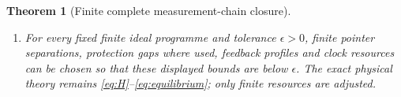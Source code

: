 \documentclass[11pt]{article}
\newtheorem{theorem}{Theorem}[section]
\theoremstyle{definition}\newtheorem{assumption}[theorem]{Constitutive assumption}
\theoremstyle{remark}\newtheorem{remark}[theorem]{Remark}
\begin{document}
\begin{theorem}[Finite complete measurement-chain closure]
\begin{enumerate}
\begin{equation}\label{eq:totalhist}
 E_{\rm hist}\le\min\{1,E_{\rm out}+E_{\rm arch}+E_{\rm transfer}\}.
\end{equation}
For registers declared directly in their permanent archive and never transferred, $E_{\rm transfer}=0$. In the exact driven key-preserving library, $E_{\rm arch}=0$ and the sharper purely classical classification bound is $\sum_j\delta_j$ when every displayed occurrence is included and no other perturbation is present.
\item For every fixed finite ideal programme and tolerance $\epsilon>0$, finite pointer separations, protection gaps where used, feedback profiles and clock resources can be chosen so that these displayed bounds are below $\epsilon$. The exact physical theory remains \eqref{eq:H}--\eqref{eq:equilibrium}; only finite resources are adjusted.
\end{enumerate}
\end{theorem}
\end{document}
